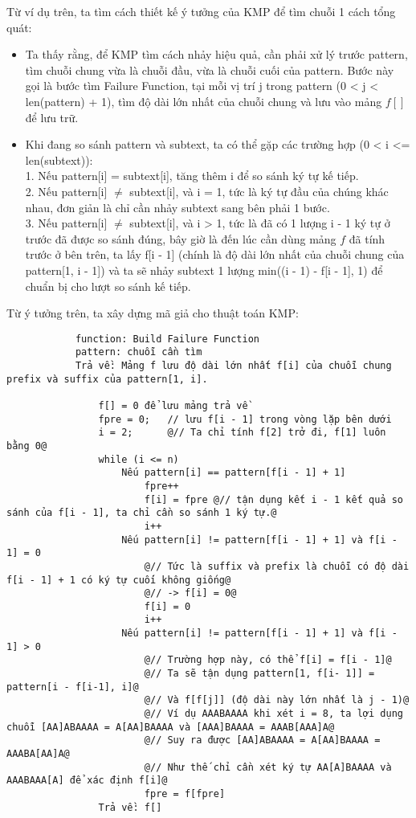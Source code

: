 \documentclass[a4paper,11pt]{article}
\begin{document}
\begin{enumerate}
			Từ ví dụ trên, ta tìm cách thiết kế ý tưởng của KMP để tìm chuỗi 1 cách tổng quát:
			\begin{itemize}
				\item Ta thấy rằng, để KMP tìm cách nhảy hiệu quả, cần phải xử lý trước pattern, tìm chuỗi chung vừa là chuỗi đầu, vừa là chuỗi cuối của pattern.
				Bước này gọi là bước tìm Failure Function, tại mỗi vị trí j trong pattern (0 < j < len(pattern) + 1), tìm độ dài lớn nhất của chuỗi chung và lưu vào mảng $f[]$ để lưu trữ.
				\item Khi đang so sánh pattern và subtext, ta có thể gặp các trường hợp (0 < i <= len(subtext)): \\
				1. Nếu pattern[i] = subtext[i], tăng thêm i để so sánh ký tự kế tiếp. \\
				2. Nếu pattern[i] $\neq$ subtext[i], và i = 1, tức là ký tự đầu của chúng khác nhau, đơn giản là chỉ cần nhảy subtext sang bên phải 1 bước.\\
				3. Nếu pattern[i] $\neq$ subtext[i], và i > 1, tức là đã có 1 lượng i - 1 ký tự ở trước đã được so sánh đúng, bây giờ là đến lúc cần dùng mảng $f$ đã tính trước ở bên trên, ta lấy f[i - 1] 
				(chính là độ dài lớn nhất của chuỗi chung của pattern[1, i - 1]) và ta sẽ nhảy subtext 1 lượng min((i - 1) - f[i - 1], 1) để chuẩn bị cho lượt so sánh kế tiếp.
			\end{itemize}
			
			Từ ý tưởng trên, ta xây dựng mã giả cho thuật toán KMP:

			\begin{lstlisting}
			function: Build Failure Function
			pattern: chuỗi cần tìm 
			Trả về: Mảng f lưu độ dài lớn nhất f[i] của chuỗi chung prefix và suffix của pattern[1, i].

				f[] = 0 để lưu mảng trả về
				fpre = 0;   // lưu f[i - 1] trong vòng lặp bên dưới
				i = 2;		@// Ta chỉ tính f[2] trở đi, f[1] luôn bằng 0@
				while (i <= n)		
					Nếu pattern[i] == pattern[f[i - 1] + 1]
						fpre++
						f[i] = fpre	@// tận dụng kết i - 1 kết quả so sánh của f[i - 1], ta chỉ cần so sánh 1 ký tự.@
						i++
					Nếu pattern[i] != pattern[f[i - 1] + 1] và f[i - 1] = 0
						@// Tức là suffix và prefix là chuỗi có độ dài f[i - 1] + 1 có ký tự cuối không giống@
						@// -> f[i] = 0@
						f[i] = 0
						i++
					Nếu pattern[i] != pattern[f[i - 1] + 1] và f[i - 1] > 0
						@// Trường hợp này, có thể f[i] = f[i - 1]@
						@// Ta sẽ tận dụng pattern[1, f[i- 1]] = pattern[i - f[i-1], i]@
						@// Và f[f[j]] (độ dài này lớn nhất là j - 1)@
						@// Ví dụ AAABAAAA khi xét i = 8, ta lợi dụng chuỗi [AA]ABAAAA = A[AA]BAAAA và [AAA]BAAAA = AAAB[AAA]A@
						@// Suy ra được [AA]ABAAAA = A[AA]BAAAA = AAABA[AA]A@
						@// Như thế chỉ cần xét ký tự AA[A]BAAAA và AAABAAA[A] để xác định f[i]@
						fpre = f[fpre]
				Trả về: f[]


\end{lstlisting}
\end{enumerate}
\end{document}
